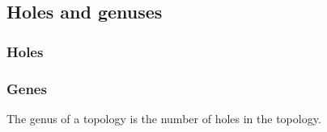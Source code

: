 
\subsection{Holes and genuses}


\subsubsection{Holes}
\subsubsection{Genes}

The genus of a topology is the number of holes in the topology.

